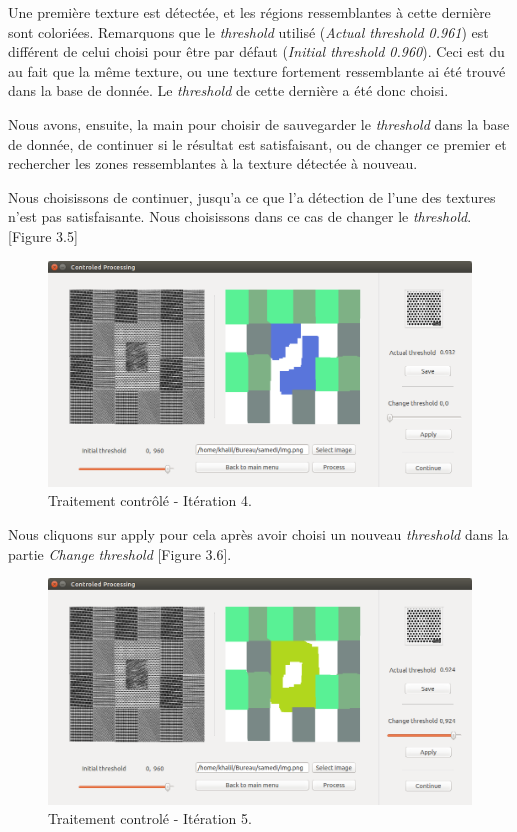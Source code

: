\indent Une première texture est détectée, et les régions ressemblantes à cette dernière sont coloriées. Remarquons que le \textit{threshold} utilisé (\textit{Actual threshold 0.961}) est différent de celui choisi pour être par défaut (\textit{Initial threshold 0.960}). Ceci est du au fait que la même texture, ou une texture fortement ressemblante ai été trouvé dans la base de donnée. Le \textit{threshold} de cette dernière a été donc choisi.

\indent Nous avons, ensuite, la main pour choisir de sauvegarder le \textit{threshold} dans la base de donnée, de continuer si le résultat est satisfaisant, ou de changer ce premier et rechercher les zones ressemblantes à la texture détectée à nouveau.

\indent Nous choisissons de continuer, jusqu'a ce que l'a détection de l'une des textures n'est pas satisfaisante. Nous choisissons dans ce cas de changer le \textit{threshold}.[Figure 3.5]


\begin{figure}[H]
	\centering
		\includegraphics[width=15cm,]{Figures/chap3/Capture4826.png}
	\caption[traitementAutofin]{Traitement contrôlé - Itération 4.}
	\label{fig:traitementAutofin}
\end{figure}

Nous cliquons sur apply pour cela après avoir choisi un nouveau \textit{threshold} dans la partie \textit{Change threshold} [Figure 3.6].

\begin{figure}[H]
	\centering
		\includegraphics[width=15cm,]{Figures/chap3/Capture5010.png}
	\caption[traitementAutofin]{Traitement controlé - Itération 5.}
	\end{figure}

